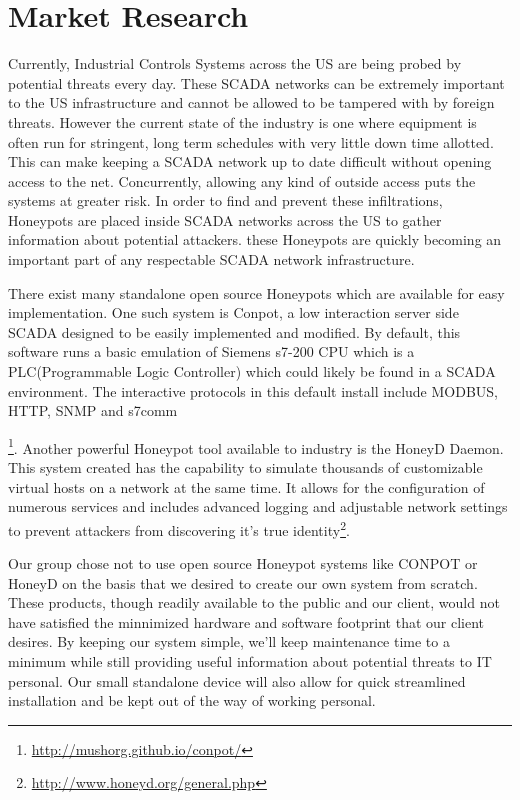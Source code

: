 \chapter{Market Research}

Currently, Industrial Controls Systems across the US are being probed by potential threats every day. These SCADA networks can be extremely important to the US infrastructure and cannot be allowed to be tampered with by foreign threats. However the current state of the industry is one where equipment is often run for stringent, long term schedules with very little down time allotted. This can make keeping a SCADA network up to date difficult without opening access to the net. Concurrently, allowing any kind of outside access puts the systems at greater risk. In order to find and prevent these infiltrations, Honeypots are placed inside SCADA networks across the US to gather information about potential attackers. these Honeypots are quickly becoming an important part of any respectable SCADA network infrastructure. 


There exist many standalone open source Honeypots which are available for easy implementation. One such system is Conpot, a low interaction server side SCADA designed to be easily implemented and modified. By default, this software runs a basic emulation of Siemens s7-200 CPU which is a PLC(Programmable Logic Controller) which could likely be found in a SCADA environment. The interactive protocols in this default install include MODBUS, HTTP, SNMP and s7comm\addtocounter{footnote}{6}\footnote{\url{http://mushorg.github.io/conpot/}}. Another powerful Honeypot tool available to industry is the HoneyD Daemon. This system created has the capability to simulate thousands of customizable virtual hosts on a network at the same time. It allows for the configuration of numerous services and includes advanced logging and adjustable network settings to prevent attackers from discovering it's true identity\footnote{\url{http://www.honeyd.org/general.php}}.


Our group chose not to use open source Honeypot systems like CONPOT  or HoneyD on the basis that we desired to create our own system from scratch. These products, though readily available to the public and our client, would not have satisfied the minnimized hardware and software footprint that our client desires. By keeping our system simple, we’ll keep maintenance time to a minimum while still providing useful information about potential threats to IT personal. Our small standalone device will also allow for quick streamlined installation and be kept out of the way of working personal. 
